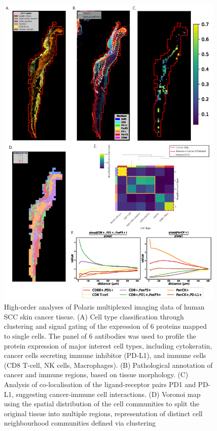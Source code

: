 \begin{figure}
    \centering
    \includegraphics[width=0.8\columnwidth]{Chapter3/Figures/Minh_figure3-01.png}
    \caption[Analyses of Polaris multiplexed imaging of human SCC skin cancer tissue.]{High-order analyses of Polaris multiplexed imaging data of human SCC skin cancer tissue. (A) Cell type classification through clustering and signal gating of the expression of 6 proteins mapped to single cells. The panel of 6 antibodies was used to profile the protein expression of major interest cell types, including cytokeratin, cancer cells secreting immune inhibitor (PD-L1), and immune cells (CD8 T-cell, NK cells, Macrophages). (B) Pathological annotation of cancer and immune regions, based on tissue morphology. (C) Analysis of co-localisation of the ligand-receptor pairs PD1 and PD-L1, suggesting cancer-immune cell interactions. (D) Voronoi map using the spatial distribution of the cell communities to split the original tissue into multiple regions, representation of distinct cell neighbourhood communities defined via clustering}
    \label{fig:skin_cancer_polaris}
    
\end{figure}

